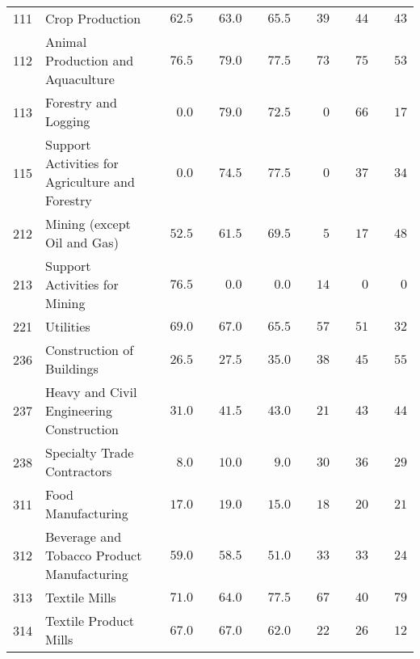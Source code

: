 \documentclass[9pt, oneside]{article}   	%
\begin{document}
\begin{longtable}{lp{3in}cccccc}
111  & Crop Production & $\phantom{00}62.5$ & $\phantom{00}63.0$ & $\phantom{00}65.5$ & $\phantom{00}39$ & $\phantom{00}44$ & $\phantom{00}43$ \\
112  & Animal Production and Aquaculture & $\phantom{00}76.5$ & $\phantom{00}79.0$ & $\phantom{00}77.5$ & $\phantom{00}73$ & $\phantom{00}75$ & $\phantom{00}53$ \\
113  & Forestry and Logging & $\phantom{000}0.0$ & $\phantom{00}79.0$ & $\phantom{00}72.5$ & $\phantom{000}0$ & $\phantom{00}66$ & $\phantom{00}17$ \\
115  & Support Activities for Agriculture and Forestry & $\phantom{000}0.0$ & $\phantom{00}74.5$ & $\phantom{00}77.5$ & $\phantom{000}0$ & $\phantom{00}37$ & $\phantom{00}34$ \\
212  & Mining (except Oil and Gas) & $\phantom{00}52.5$ & $\phantom{00}61.5$ & $\phantom{00}69.5$ & $\phantom{000}5$ & $\phantom{00}17$ & $\phantom{00}48$ \\
213  & Support Activities for Mining & $\phantom{00}76.5$ & $\phantom{000}0.0$ & $\phantom{000}0.0$ & $\phantom{00}14$ & $\phantom{000}0$ & $\phantom{000}0$ \\
221  & Utilities & $\phantom{00}69.0$ & $\phantom{00}67.0$ & $\phantom{00}65.5$ & $\phantom{00}57$ & $\phantom{00}51$ & $\phantom{00}32$ \\
236  & Construction of Buildings & $\phantom{00}26.5$ & $\phantom{00}27.5$ & $\phantom{00}35.0$ & $\phantom{00}38$ & $\phantom{00}45$ & $\phantom{00}55$ \\
237  & Heavy and Civil Engineering Construction & $\phantom{00}31.0$ & $\phantom{00}41.5$ & $\phantom{00}43.0$ & $\phantom{00}21$ & $\phantom{00}43$ & $\phantom{00}44$ \\
238  & Specialty Trade Contractors & $\phantom{000}8.0$ & $\phantom{00}10.0$ & $\phantom{000}9.0$ & $\phantom{00}30$ & $\phantom{00}36$ & $\phantom{00}29$ \\
311  & Food Manufacturing & $\phantom{00}17.0$ & $\phantom{00}19.0$ & $\phantom{00}15.0$ & $\phantom{00}18$ & $\phantom{00}20$ & $\phantom{00}21$ \\
312  & Beverage and Tobacco Product Manufacturing & $\phantom{00}59.0$ & $\phantom{00}58.5$ & $\phantom{00}51.0$ & $\phantom{00}33$ & $\phantom{00}33$ & $\phantom{00}24$ \\
313  & Textile Mills & $\phantom{00}71.0$ & $\phantom{00}64.0$ & $\phantom{00}77.5$ & $\phantom{00}67$ & $\phantom{00}40$ & $\phantom{00}79$ \\
314  & Textile Product Mills & $\phantom{00}67.0$ & $\phantom{00}67.0$ & $\phantom{00}62.0$ & $\phantom{00}22$ & $\phantom{00}26$ & $\phantom{00}12$ \\

\end{longtable}
\end{document}

